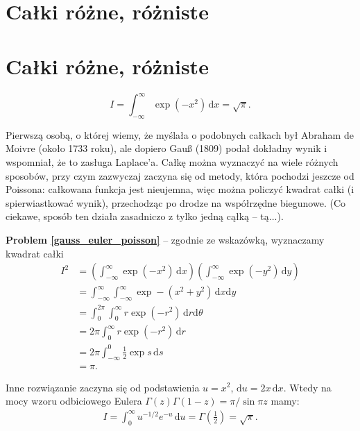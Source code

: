 
\section{Całki różne, różniste}
\section{Całki różne, różniste}

\begin{problem}
    \label{gauss_euler_poisson}%
    \begin{equation}
        I = \int_{-\infty}^\infty \exp \left( -x^2 \right) \,\mathrm{d} x = \sqrt{\pi}.
    \end{equation}
\end{problem}

Pierwszą osobą, o której wiemy, że myślała o podobnych całkach był Abraham de Moivre (około 1733 roku), ale dopiero Gauß (1809) podał dokładny wynik i wspomniał, że to zasługa Laplace'a.
Całkę można wyznaczyć na wiele różnych sposobów, przy czym zazwyczaj zaczyna się od metody, która pochodzi jeszcze od Poissona: całkowana funkcja jest nieujemna, więc można policzyć kwadrat całki (i spierwiastkować wynik), przechodząc po drodze na współrzędne biegunowe.
(Co ciekawe, sposób ten działa zasadniczo z tylko jedną cąłką -- tą...).

\textbf{Problem \ref{gauss_euler_poisson}} -- zgodnie ze wskazówką, wyznaczamy kwadrat całki
\begin{align}
    I^2 & = \left(\int_{-\infty}^\infty \exp \left( -x^2 \right) \,\mathrm{d}x\right)\left(\int_{-\infty}^\infty \exp \left( -y^2 \right) \,\mathrm{d}y\right) \\
    & = \int_{-\infty}^\infty \int_{-\infty}^\infty \exp - \left(x^2+y^2\right) \,\mathrm{d}x \mathrm{d}y \\
    & = \int_0^{2\pi} \int_0^\infty r \exp (-r^2) \,\mathrm{d}r \mathrm{d}\theta \\
    & = 2\pi \int_0^\infty r \exp (-r^2) \,\mathrm{d} r \\
    & = 2\pi \int^0_{-\infty} \frac 1 2 \exp s \,\mathrm{d} s \\
    & = \pi.
\end{align}

Inne rozwiązanie zaczyna się od podstawienia $u = x^2$, $\mathrm{d} u = 2x \,\mathrm{d}x$.
Wtedy na mocy wzoru odbiciowego Eulera $\Gamma (z) \Gamma(1-z) = \pi/\sin \pi z$ mamy:
\begin{align}
	I = \int_0^\infty u^{-1/2} e^{-u}\,\mathrm{d}u = \Gamma \left(\frac 12\right) = \sqrt{\pi}.
\end{align}

